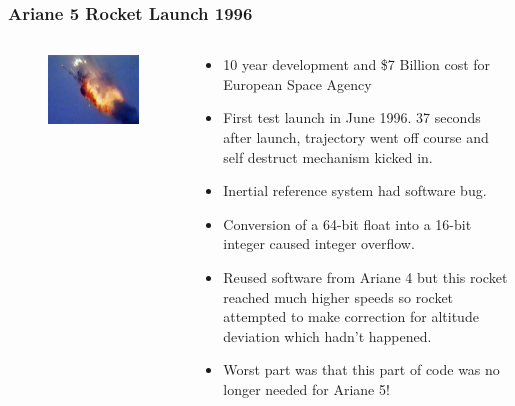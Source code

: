 \documentclass{beamer}
\begin{document}
\begin{frame}
    \frametitle{Ariane 5 Rocket Launch 1996}
    \begin{columns}
        \begin{column}{0.35\textwidth}
            \begin{figure}
                \includegraphics[width=\columnwidth]{images/ariane5.jpeg}
            \end{figure}
        \end{column}
    
        \begin{column}{0.65\textwidth}
            \begin{itemize}
                \item 10 year development and \$7 Billion cost for European Space Agency
                \item First test launch in June 1996. 37 seconds after launch, trajectory went off course and self destruct mechanism kicked in.
                \item Inertial reference system had software bug.
                \item Conversion of a 64-bit float into a 16-bit integer caused integer overflow.
                \item Reused software from Ariane 4 but this rocket reached much higher speeds so rocket attempted to make correction for altitude deviation which hadn't happened.
                \item Worst part was that this part of code was no longer needed for Ariane 5!
            \end{itemize}
        \end{column}
    \end{columns}
\end{frame}
\end{document}
